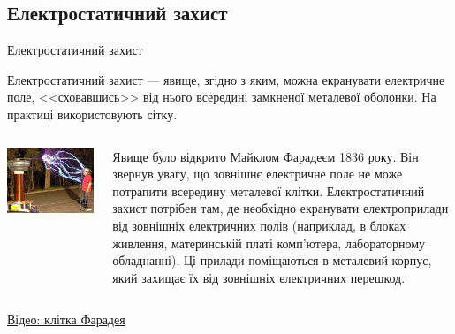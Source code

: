 \documentclass{beamer}
\begin{document}
\subsection{Електростатичний захист}



\begin{frame}{Електростатичний захист}
	\begin{block}{}\justifying
		Електростатичний захист --- явище, згідно з яким, можна екранувати електричне поле,
		<<сховавшись>> від нього всередині замкненої металевої оболонки. На практиці
		використовують сітку.
	\end{block}
	\begin{columns}
		\begin{column}{0.5\linewidth}\centering
			\includegraphics[width=\linewidth]{FaradayCage}
		\end{column}
		\begin{column}{0.5\linewidth}
			\begin{block}{}\scriptsize\justifying
				Явище було відкрито Майклом Фарадеєм 1836 року. Він звернув увагу, що зовнішнє
				електричне поле не може потрапити всередину металевої клітки. Електростатичний
				захист потрібен там, де необхідно екранувати електроприлади від зовнішніх
				електричних полів (наприклад, в блоках живлення, материнській платі комп'ютера,
				лабораторному обладнанні). Ці прилади поміщаються в металевий корпус, який захищає
				їх від зовнішніх електричних перешкод.
			\end{block}
		\end{column}
	\end{columns}
	\begin{block}{}
		\href{https://www.youtube.com/watch?v=jsBmv3-i2g0}{Відео: клітка Фарадея}
	\end{block}
\end{frame}
\end{document}

